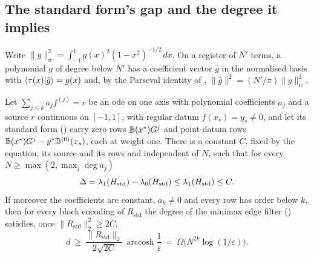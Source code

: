 \subsection{The standard form's gap and the degree it implies}
\label{app:std-gap}

Write $\|g\|_w^2=\int_{-1}^{1}g(x)^2(1-x^2)^{-1/2}\,dx$. On a register of $N'$ terms, a polynomial $g$ of degree below $N'$ has a coefficient vector $\hat g$ in the normalised basis with $\braket{\tau(x)|\hat g}=g(x)$ and, by the Parseval identity of , $\|\hat g\|^2=(N'/\pi)\|g\|_w^2$.

\begin{proposition}
\label{prop:std-gap-bound}
Let $\sum_{j\le k}a_jf^{(j)}=r$ be an \gls{ode} on one axis with polynomial coefficients $a_j$ and a source $r$ continuous on $[-1,1]$, with regular datum $f(x_s)=y_s\ne0$, and let its standard form () carry zero rows $\mathbb{B}(x^*)G^{j}$ and point-datum rows $\mathbb{B}(x^*)G^{j}-y^*\mathbb{D}^{(0)}(x_s)$, each at weight one. There is a constant $C$, fixed by the equation, its source and its rows and independent of $N$, such that for every $N\ge\max(2,\max_j\deg a_j)$
\begin{equation*}
    \Delta=\lambda_1(H_{\mathrm{std}})-\lambda_0(H_{\mathrm{std}})\le\lambda_1(H_{\mathrm{std}})\le C .
\end{equation*}
If moreover the coefficients are constant, $a_k\ne0$ and every row has order below $k$, then for every block encoding of $R_{\mathrm{std}}$ the degree of the minimax edge filter () satisfies, once $\|R_{\mathrm{std}}\|_2^2\ge2C$,
\begin{equation*}
    d\ \ge\ \frac{\|R_{\mathrm{std}}\|_2}{2\sqrt{2C}}\,\operatorname{arccosh}\frac1\varepsilon\ =\ \Omega\bigl(N^{2k}\log(1/\varepsilon)\bigr).
\end{equation*}
\end{proposition}
